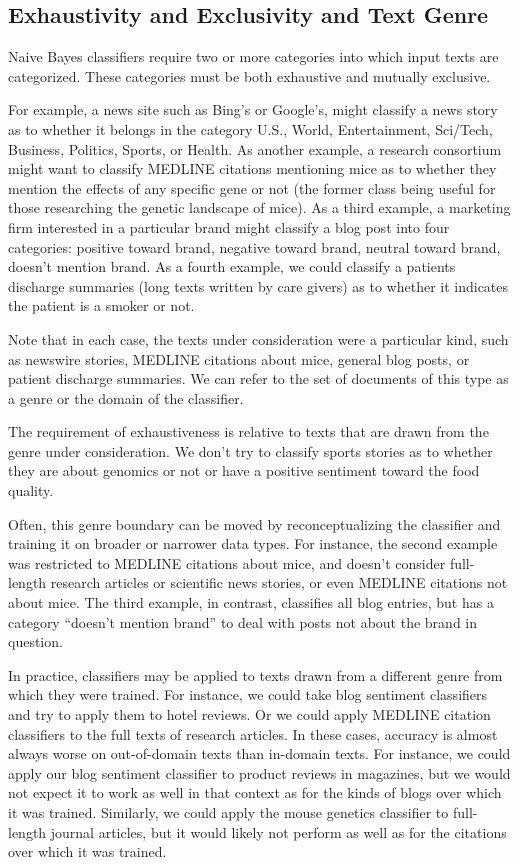 \subsection{Exhaustivity and Exclusivity and Text Genre}

Naive Bayes classifiers require two or more categories into which
input texts are categorized.  These categories must be both exhaustive
and mutually exclusive.

For example, a news site such as Bing's or Google's, might classify a
news story as to whether it belongs in the category U.S., World,
Entertainment, Sci/Tech, Business, Politics, Sports, or Health.  As
another example, a research consortium might want to classify MEDLINE
citations mentioning mice as to whether they mention the effects of
any specific gene or not (the former class being useful for those
researching the genetic landscape of mice).  As a third example, a
marketing firm interested in a particular brand might classify a blog
post into four categories: positive toward brand, negative toward
brand, neutral toward brand, doesn't mention brand.  As a fourth
example, we could classify a patients discharge summaries (long texts
written by care givers) as to whether it indicates the patient is a
smoker or not.

Note that in each case, the texts under consideration were a
particular kind, such as newswire stories, MEDLINE citations about
mice, general blog posts, or patient discharge summaries.  We can
refer to the set of documents of this type as a genre or the domain of
the classifier.

The requirement of exhaustiveness is relative to texts that are drawn
from the genre under consideration.  We don't try to classify sports
stories as to whether they are about genomics or not or have a
positive sentiment toward the food quality.  

Often, this genre boundary can be moved by reconceptualizing the
classifier and training it on broader or narrower data types.  For
instance, the second example was restricted to MEDLINE citations about
mice, and doesn't consider full-length research articles or scientific
news stories, or even MEDLINE citations not about mice.  The third
example, in contrast, classifies all blog entries, but has a category
``doesn't mention brand'' to deal with posts not about the brand in
question.

In practice, classifiers may be applied to texts drawn from a
different genre from which they were trained.  For instance, we could
take blog sentiment classifiers and try to apply them to hotel
reviews.  Or we could apply MEDLINE citation classifiers to the full
texts of research articles.  In these cases, accuracy is almost always
worse on out-of-domain texts than in-domain texts.  For instance, we
could apply our blog sentiment classifier to product reviews in
magazines, but we would not expect it to work as well in that context
as for the kinds of blogs over which it was trained.  Similarly, we
could apply the mouse genetics classifier to full-length journal
articles, but it would likely not perform as well as for the citations
over which it was trained.

